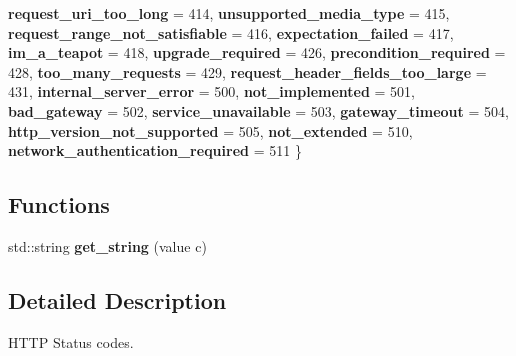 \begin{DoxyCompactItemize}
{\bfseries request\+\_\+uri\+\_\+too\+\_\+long} = 414, 
\newline
{\bfseries unsupported\+\_\+media\+\_\+type} = 415, 
{\bfseries request\+\_\+range\+\_\+not\+\_\+satisfiable} = 416, 
{\bfseries expectation\+\_\+failed} = 417, 
{\bfseries im\+\_\+a\+\_\+teapot} = 418, 
\newline
{\bfseries upgrade\+\_\+required} = 426, 
{\bfseries precondition\+\_\+required} = 428, 
{\bfseries too\+\_\+many\+\_\+requests} = 429, 
{\bfseries request\+\_\+header\+\_\+fields\+\_\+too\+\_\+large} = 431, 
\newline
{\bfseries internal\+\_\+server\+\_\+error} = 500, 
{\bfseries not\+\_\+implemented} = 501, 
{\bfseries bad\+\_\+gateway} = 502, 
{\bfseries service\+\_\+unavailable} = 503, 
\newline
{\bfseries gateway\+\_\+timeout} = 504, 
{\bfseries http\+\_\+version\+\_\+not\+\_\+supported} = 505, 
{\bfseries not\+\_\+extended} = 510, 
{\bfseries network\+\_\+authentication\+\_\+required} = 511
 \}
\end{DoxyCompactItemize}
\subsection*{Functions}
\begin{DoxyCompactItemize}
\item 
\mbox{\label{namespacewebsocketpp_1_1http_1_1status__code_a883bc82f3dce18b493ba7a5252603ba6}} 
std\+::string {\bfseries get\+\_\+string} (value c)
\end{DoxyCompactItemize}


\subsection{Detailed Description}
H\+T\+TP Status codes. 